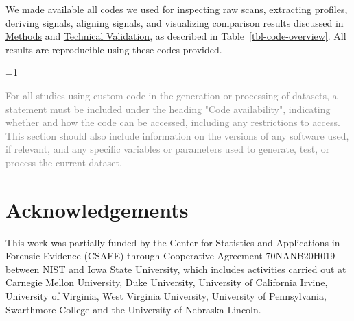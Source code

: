 \documentclass[fleqn,10pt]{wlscirep}
\newcommand{\ifinstruction}{0} %
\begin{document}
We made available all codes we used for inspecting raw scans, extracting
profiles, deriving signals, aligning signals, and visualizing comparison
results discussed in \hyperref[sec-methods]{Methods} and
\hyperref[sec-technical-validation]{Technical Validation}, as described
in Table~\ref{tbl-code-overview}. All results are reproducible using
these codes provided.

\ifnum \ifinstruction=1

\textcolor{gray}{For all studies using custom code in the generation or processing of datasets, a statement must be included under the heading "Code availability", indicating whether and how the code can be accessed, including any restrictions to access. This section should also include information on the versions of any software used, if relevant, and any specific variables or parameters used to generate, test, or process the current dataset.}
\fi




\section*{Acknowledgements} 
This work was partially funded by the Center for Statistics and
Applications in Forensic Evidence (CSAFE) through Cooperative Agreement
70NANB20H019 between NIST and Iowa State University, which includes
activities carried out at Carnegie Mellon University, Duke University,
University of California Irvine, University of Virginia, West Virginia
University, University of Pennsylvania, Swarthmore College and the
University of Nebraska-Lincoln.
\end{document}
